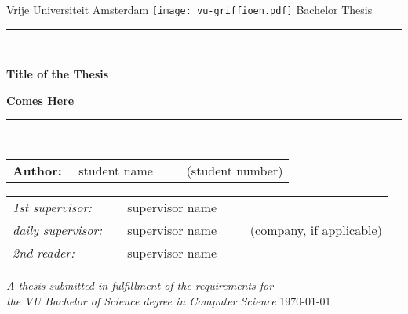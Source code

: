 \documentclass[11pt]{article}
\begin{document}
\thispagestyle{empty}
\begin{center}
Vrije Universiteit Amsterdam
\vspace{1mm}
\texttt{[image: vu-griffioen.pdf]}
\vspace{1.5cm}
{\Large Bachelor Thesis}
\vspace*{1.5cm}
\rule{.9\linewidth}{.6pt}\\[0.4cm]
{\huge \bfseries Title of the Thesis\par}
{\huge \bfseries Comes Here\par}\vspace{0.4cm}
\rule{.9\linewidth}{.6pt}\\[1.5cm]
\vspace*{2mm}
{\Large
\begin{tabular}{l}
{\bf Author:} ~~student name ~~~~ (student number)
\end{tabular}
}
\vspace*{1.5cm}
\begin{tabular}{ll}
{\it 1st supervisor:} & ~~supervisor name \\
{\it daily supervisor:} & ~~supervisor name ~~~~ (company, if applicable) \\
{\it 2nd reader:} & ~~supervisor name
\end{tabular}
\vspace*{2cm}
\textit{A thesis submitted in fulfillment of the requirements for\\ the VU Bachelor
of Science degree in Computer Science }
\vspace*{1cm}
\today\\[4cm] %
\end{center}
\newpage
\end{document}
